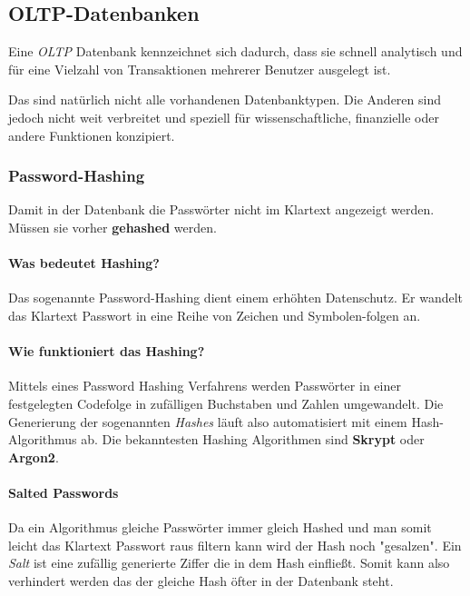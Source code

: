 \subsection{OLTP-Datenbanken}
Eine \textit{OLTP} Datenbank kennzeichnet sich dadurch, dass sie schnell analytisch und für eine
Vielzahl von Transaktionen mehrerer Benutzer ausgelegt ist.

Das sind natürlich nicht alle vorhandenen Datenbanktypen. Die Anderen sind jedoch
nicht weit verbreitet und speziell für wissenschaftliche, finanzielle oder andere Funktionen konzipiert.

\subsubsection{Password-Hashing}
Damit in der Datenbank die Passwörter nicht im Klartext angezeigt werden.
Müssen sie vorher \textbf{gehashed} werden.

\paragraph{Was bedeutet Hashing?}
Das sogenannte Password-Hashing dient einem erhöhten Datenschutz. Er
wandelt das Klartext Passwort in eine Reihe von Zeichen und Symbolen-folgen an.

\paragraph{Wie funktioniert das Hashing?}
Mittels eines Password Hashing Verfahrens werden Passwörter in einer festgelegten
Codefolge in zufälligen Buchstaben und Zahlen umgewandelt. Die Generierung der
sogenannten \textit{Hashes} läuft also automatisiert mit einem Hash-Algorithmus ab.
Die bekanntesten Hashing Algorithmen sind \textbf{Skrypt} oder \textbf{Argon2}.

\paragraph{Salted Passwords}
Da ein Algorithmus gleiche Passwörter immer gleich Hashed und man somit leicht
das Klartext Passwort raus filtern kann wird der Hash noch "gesalzen". Ein \textit{Salt}
ist eine zufällig generierte Ziffer die in dem Hash einfließt. Somit kann also verhindert
werden das der gleiche Hash öfter in der Datenbank steht.
\cite{Hashing}

